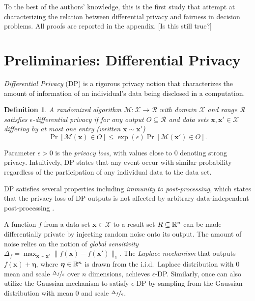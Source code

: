 \documentclass[9pt,twocolumn,twoside,lineno]{pnas-new}
\newtheorem{definition}{Definition}
\newcommand{\cM}{\mathcal{M}}
\newcommand{\cR}{\mathcal{R}}
\newcommand{\cX}{\mathcal{X}}
\begin{document}
To the best of the authors' knowledge, this is the first study that
attempt at characterizing the relation between differential privacy
and fairness in decision problems. All proofs are reported in the
appendix. [Is this still true?]


\section*{Preliminaries: Differential Privacy}

\emph{Differential Privacy} \cite{Dwork:06} (DP) is a rigorous privacy notion that characterizes the amount of information of an individual's data being disclosed in a computation.


\begin{definition}%
  A randomized algorithm $\cM:\cX \to \cR$ with domain $\cX$ and range $\cR$ satisfies $\epsilon$-\emph{differential privacy} if
  for any output $O \subseteq \cR$ and data sets $\bm{x}, \bm{x}' \in \cX$ differing by at most one entry (written $\bm{x} \sim \bm{x}'$) 
  \begin{equation}
  \label{eq:dp}
    \Pr[\cM(\bm{x}) \in O] \leq \exp(\epsilon) \Pr[\cM(\bm{x}') \in O]. 
  \end{equation}
\end{definition}

\noindent 
Parameter $\epsilon \!>\! 0$ is the \emph{privacy loss}, with values close 
to $0$ denoting strong privacy. Intuitively, DP states that 
any event occur with similar probability regardless of the participation
of any individual data to the data set. 

DP satisfies several properties including 
\emph{immunity to post-processing}, which states that the privacy 
loss of DP outputs is not affected by arbitrary data-independent 
post-processing \cite{Dwork:13}.

A function $f$ from a data set $\bm{x} \in \cX$ to a result set 
$R \subseteq \mathbb{R}^n$ can be made differentially private by injecting 
random noise onto its output. The amount of noise relies on the notion 
of \emph{global sensitivity} %
\(
\Delta_f = \max_{\bm{x} \sim \bm{x}'} \| f(\bm{x}) - f(\bm{x}') \|_1.
\)
The \emph{Laplace mechanism} \cite{Dwork:06} that outputs $f(\bm{x}) + \bm{\eta}$, where $\bm{\eta} \in \mathbb{R}^n$ is drawn from the i.i.d.~Laplace distribution with $0$ mean and scale  $\nicefrac{\Delta_f}{\epsilon}$ over $n$ dimensions, achieves $\epsilon$-DP. Similarly, once can also utilize the Gaussian mechanism to satisfy $\epsilon$-DP by sampling from the Gaussian distribution with mean 0 and scale $\nicefrac{\Delta_f}{\epsilon}$. 
\end{document}
